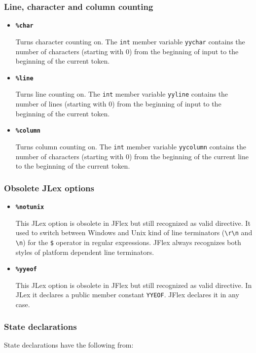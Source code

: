 \documentclass[11pt]{scrartcl}
\begin{document}
\begin{itemize}
 \end{itemize}
\subsubsection{Line, character and column counting\label{Counting}}
\begin{itemize}
\item
{\bf \texttt{\%char}}

Turns character counting on. The \texttt{int} member variable \texttt{yychar}
contains the number of characters (starting with 0) from the beginning
of input to the beginning of the current token.
 
\item
{\bf \texttt{\%line}}

Turns line counting on. The \texttt{int} member variable \texttt{yyline}
contains the number of lines (starting with 0) from the beginning of input
to the beginning of the current token.
 
\item
{\bf \texttt{\%column}}

Turns column counting on. The \texttt{int} member variable \texttt{yycolumn}
contains the number of characters (starting with 0) from the beginning
of the current line to the beginning of the current token.

 \end{itemize}

\subsubsection{Obsolete JLex options\label{Obsolete}}
\begin{itemize}
\item
{\bf \texttt{\%notunix}}

This JLex option is obsolete in JFlex but still recognized as valid directive.
It used to switch between Windows and Unix kind of line terminators (\verb+\r\n+
and \verb+\n+) for the \texttt{\$} operator in regular expressions. JFlex
always recognizes both styles of platform dependent line terminators.
 
\item
{\bf \texttt{\%yyeof}}

This JLex option is obsolete in JFlex but still recognized as valid directive.
In JLex it declares a public member constant \texttt{YYEOF}. JFlex declares it in any case.
\end{itemize}

\subsubsection{State declarations\label{StateDecl}}
State declarations have the following from:
\end{document}
